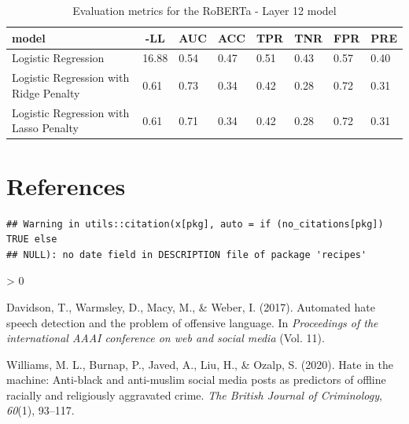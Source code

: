 \documentclass[
  english,
  man]{apa6}
\newlength{\cslhangindent}
\newenvironment{CSLReferences}[2] %
 {%
  \setlength{\parindent}{0pt}
  \ifodd #1 \everypar{\setlength{\hangindent}{\cslhangindent}}\ignorespaces\fi
  \ifnum #2 > 0
  \setlength{\parskip}{#2\baselineskip}
  \fi
 }%
 {}
\begin{document}
\begin{table}[tbp]

\begin{center}
\begin{threeparttable}

\caption{\label{tab:unnamed-chunk-13}Evaluation metrics for the RoBERTa - Layer 12 model}

\begin{tabular}{llllllll}
\toprule
model & \multicolumn{1}{c}{-LL} & \multicolumn{1}{c}{AUC} & \multicolumn{1}{c}{ACC} & \multicolumn{1}{c}{TPR} & \multicolumn{1}{c}{TNR} & \multicolumn{1}{c}{FPR} & \multicolumn{1}{c}{PRE}\\
\midrule
Logistic Regression & 16.88 & 0.54 & 0.47 & 0.51 & 0.43 & 0.57 & 0.40\\
Logistic Regression with Ridge Penalty & 0.61 & 0.73 & 0.34 & 0.42 & 0.28 & 0.72 & 0.31\\
Logistic Regression with Lasso Penalty & 0.61 & 0.71 & 0.34 & 0.42 & 0.28 & 0.72 & 0.31\\
\bottomrule
\end{tabular}

\end{threeparttable}
\end{center}

\end{table}

\newpage

\hypertarget{references}{%
\section{References}\label{references}}

\begin{verbatim}
## Warning in utils::citation(x[pkg], auto = if (no_citations[pkg]) TRUE else
## NULL): no date field in DESCRIPTION file of package 'recipes'
\end{verbatim}

\begingroup
\setlength{\parindent}{-0.5in}
\setlength{\leftskip}{0.5in}

\hypertarget{refs}{}
\begin{CSLReferences}{1}{0}
\leavevmode\hypertarget{ref-davidson2017automated}{}%
Davidson, T., Warmsley, D., Macy, M., \& Weber, I. (2017). Automated hate speech detection and the problem of offensive language. In \emph{Proceedings of the international AAAI conference on web and social media} (Vol. 11).

\leavevmode\hypertarget{ref-williams2020hate}{}%
Williams, M. L., Burnap, P., Javed, A., Liu, H., \& Ozalp, S. (2020). Hate in the machine: Anti-black and anti-muslim social media posts as predictors of offline racially and religiously aggravated crime. \emph{The British Journal of Criminology}, \emph{60}(1), 93--117.

\end{CSLReferences}

\endgroup
\end{document}
